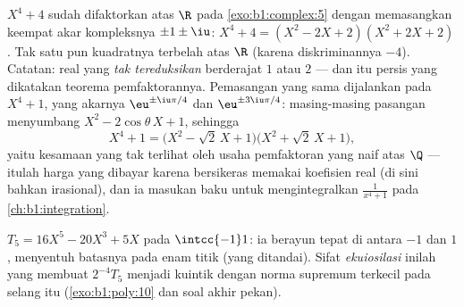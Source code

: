 \begin{example}\label{ex:b1:poly:factorexample}
$X^4 + 4$ sudah difaktorkan atas $\R$ pada \cref{exo:b1:complex:5} dengan memasangkan
keempat akar kompleksnya $\pm 1 \pm \iu$:
$X^4 + 4 = (X^2 - 2X + 2)(X^2 + 2X + 2)$. Tak satu pun kuadratnya terbelah
atas $\R$ (karena diskriminannya $-4$). Catatan:  real yang
\emph{tak tereduksikan} berderajat $1$ atau $2$ --- dan itu persis yang dikatakan
teorema pemfaktorannya. Pemasangan  yang sama dijalankan pada
$X^4 + 1$, yang akarnya $\eu^{\pm\iu\pi/4}$ dan
$\eu^{\pm3\iu\pi/4}$: masing-masing pasangan menyumbang $X^2 -
2\cos\theta\,X + 1$, sehingga
\[
X^4 + 1 = \bigl(X^2 - \sqrt2\,X + 1\bigr)
\bigl(X^2 + \sqrt2\,X + 1\bigr) ,
\]
yaitu kesamaan yang tak terlihat oleh usaha pemfaktoran yang naif atas $\Q$ ---
itulah harga yang dibayar karena bersikeras memakai koefisien real (di sini bahkan
irasional), dan ia masukan baku untuk mengintegralkan $\frac1{x^4 +
1}$ pada \cref{ch:b1:integration}.
\end{example}

\begin{omfigure}

{\small {} $T_5 = 16X^5 - 20X^3 + 5X$ pada
$\intcc{-1}1$: ia berayun tepat di antara $-1$ dan $1$,
menyentuh batasnya pada enam titik (yang ditandai). Sifat
\emph{ekuiosilasi} inilah yang membuat $2^{-4}T_5$ menjadi 
kuintik  dengan norma supremum terkecil pada selang itu
(\cref{exo:b1:poly:10} dan soal akhir pekan).}
\end{omfigure}

